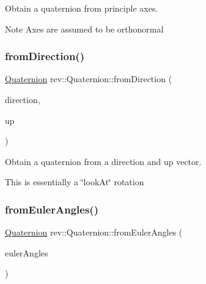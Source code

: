 Obtain a quaternion from principle axes. 

\begin{DoxyNote}{Note}
Axes are assumed to be orthonormal 
\end{DoxyNote}
\mbox{\label{classrev_1_1_quaternion_a1f172fc581c685701a8a731a5182cc1c}} 
\subsubsection{\texorpdfstring{fromDirection()}{fromDirection()}}
{\footnotesize\ttfamily \mbox{\hyperlink{classrev_1_1_quaternion}{Quaternion}} rev\+::\+Quaternion\+::from\+Direction (\begin{DoxyParamCaption}\item[{const \mbox{\hyperlink{classrev_1_1_vector}{Vector3}} \&}]{direction,  }\item[{const \mbox{\hyperlink{classrev_1_1_vector}{Vector3}} \&}]{up }\end{DoxyParamCaption})\hspace{0.3cm}{\ttfamily [static]}}



Obtain a quaternion from a direction and up vector. 

This is essentially a \char`\"{}look\+At\char`\"{} rotation \mbox{\label{classrev_1_1_quaternion_a50c2a07546cc78657d87459c4e6c34fd}} 
\subsubsection{\texorpdfstring{fromEulerAngles()}{fromEulerAngles()}}
{\footnotesize\ttfamily \mbox{\hyperlink{classrev_1_1_quaternion}{Quaternion}} rev\+::\+Quaternion\+::from\+Euler\+Angles (\begin{DoxyParamCaption}\item[{const \mbox{\hyperlink{classrev_1_1_euler_angles}{Euler\+Angles}} \&}]{euler\+Angles }\end{DoxyParamCaption})\hspace{0.3cm}{\ttfamily [static]}}




